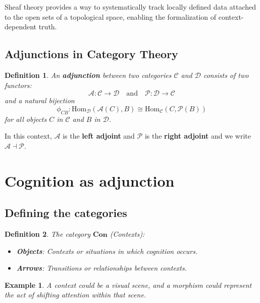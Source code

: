\documentclass{article}
\newtheorem{definition}{Definition}[section]
\newtheorem{example}{Example}[section]
\begin{document}
Sheaf theory provides a way to systematically track locally defined data attached to the open sets of a topological space, enabling the formalization of context-dependent truth.

\subsection{Adjunctions in Category Theory}

\begin{definition}
    An \textbf{adjunction} between two categories $\mathcal{C}$ and $\mathcal{D}$ consists of two functors:
    \[
        \mathcal{A} \colon \mathcal{C} \to \mathcal{D} \quad \text{and} \quad \mathcal{P} \colon \mathcal{D} \to \mathcal{C}
    \]
    and a natural bijection
    \[
        \phi_{CB} \colon \text{Hom}_{\mathcal{D}} ( \mathcal{A}(C), B ) \cong \text{Hom}_{\mathcal{C}} (C, \mathcal{P}(B))
    \]
    for all objects $C$ in $\mathcal{C}$ and $B$ in $\mathcal{D}$.
\end{definition}

In this context, $\mathcal{A}$ is the \textbf{left adjoint} and $\mathcal{P}$ is the \textbf{right adjoint} and we write $\mathcal{A} \dashv \mathcal{P}$.

\section{Cognition as adjunction}

\subsection{Defining the categories}

\begin{definition} The category $\mathbf{Con}$ (Contexts):

    \begin{itemize}
        \item \textbf{Objects}: Contexts or situations in which cognition occurs.
        \item \textbf{Arrows}: Transitions or relationships between contexts.
    \end{itemize}
\end{definition}

\begin{example} A context could be a visual scene, and a morphism could represent the act of shifting attention within that scene. \end{example}
\end{document}
